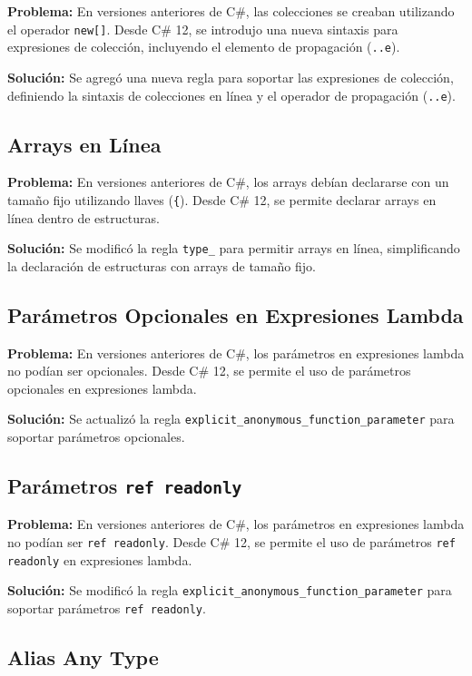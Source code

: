 \textbf{Problema:} En versiones anteriores de C\#, las colecciones se creaban utilizando el operador \texttt{new[]}. Desde C\# 12, se introdujo una nueva sintaxis para expresiones de colecci\'on, incluyendo el elemento de propagaci\'on (\texttt{..e}).

\textbf{Soluci\'on:} Se agreg\'o una nueva regla para soportar las expresiones de colecci\'on, definiendo la sintaxis de colecciones en l\'inea y el operador de propagaci\'on (\texttt{..e}).

\subsection{Arrays en L\'inea}

\textbf{Problema:} En versiones anteriores de C\#, los arrays deb\'ian declararse con un tama\~no fijo utilizando llaves (\texttt{\{}). Desde C\# 12, se permite declarar arrays en l\'inea dentro de estructuras.

\textbf{Soluci\'on:} Se modific\'o la regla \texttt{type\_} para permitir arrays en l\'inea, simplificando la declaraci\'on de estructuras con arrays de tama\~no fijo.

\subsection{Par\'ametros Opcionales en Expresiones Lambda}

\textbf{Problema:} En versiones anteriores de C\#, los par\'ametros en expresiones lambda no pod\'ian ser opcionales. Desde C\# 12, se permite el uso de par\'ametros opcionales en expresiones lambda.

\textbf{Soluci\'on:} Se actualiz\'o la regla \texttt{explicit\_anonymous\_function\_parameter} para soportar par\'ametros opcionales.

\subsection{Par\'ametros \texttt{ref readonly}}

\textbf{Problema:} En versiones anteriores de C\#, los par\'ametros en expresiones lambda no pod\'ian ser \texttt{ref readonly}. Desde C\# 12, se permite el uso de par\'ametros \texttt{ref readonly} en expresiones lambda.

\textbf{Soluci\'on:} Se modific\'o la regla \texttt{explicit\_anonymous\_function\_parameter} para soportar par\'ametros \texttt{ref readonly}.

\subsection{Alias Any Type}

